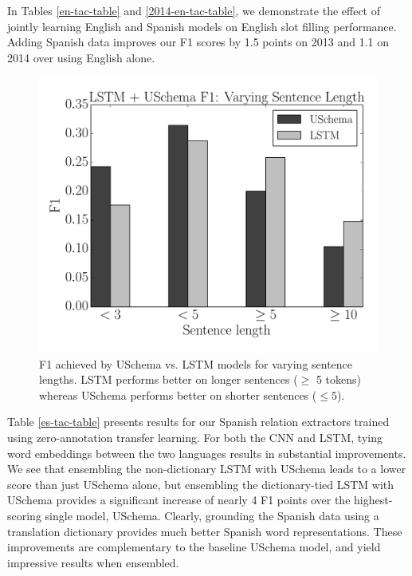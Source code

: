 
In Tables \ref{en-tac-table} and \ref{2014-en-tac-table}, we demonstrate the effect of jointly learning English and Spanish models on English slot filling performance. Adding Spanish data improves our F1 scores by 1.5 points on 2013 and 1.1 on 2014 over using English alone.

\begin{figure}
\begin{center}
\includegraphics[scale=0.45]{f1-vary-sent-length}
\caption{F1 achieved by USchema vs. LSTM models for varying sentence lengths. LSTM performs better on longer sentences ($\geq$ 5 tokens) whereas USchema performs better on shorter sentences ($\leq 5$). \label{fig:f1-vary-sents}}
\end{center}
\end{figure}

Table \ref{es-tac-table} presents results for our Spanish relation extractors trained using zero-annotation transfer learning. For both the CNN and LSTM, tying word embeddings between the two languages results in substantial improvements. We see that ensembling the non-dictionary LSTM with USchema leads to a lower score than just USchema alone, but ensembling the dictionary-tied LSTM with USchema provides a significant increase of nearly 4 F1 points over the highest-scoring single model, USchema. Clearly, grounding the Spanish data using a translation dictionary provides much better Spanish word representations. These improvements are complementary to the baseline USchema model, and yield impressive results when ensembled. 


